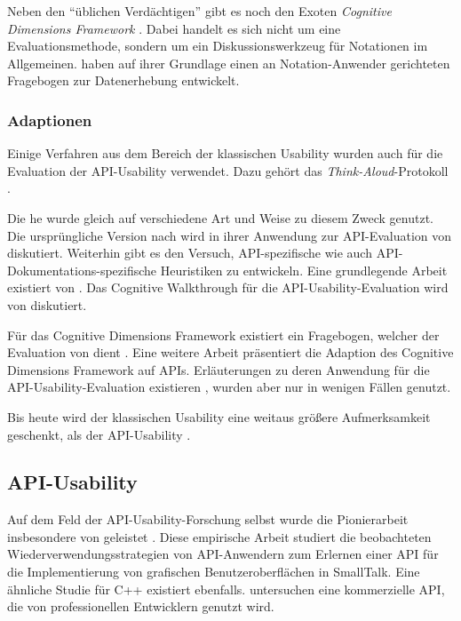 Neben den ``üblichen Verdächtigen'' gibt es noch den Exoten \textit{Cognitive Dimensions Framework} \citep{Green:1989wb,AnIntroductiontot:1996ux}. Dabei handelt es sich nicht um eine Evaluationsmethode, sondern um ein Diskussionswerkzeug für Notationen im Allgemeinen. \cite{161956} haben auf ihrer Grundlage einen an Notation-Anwender gerichteten Fragebogen zur Datenerhebung entwickelt.

\subsubsection{Adaptionen}

Einige Verfahren aus dem Bereich der klassischen Usability wurden auch für die Evaluation der API-Usability verwendet. Dazu gehört das \textit{Think-Aloud}-Protokoll \citep{Beaton:2008ix,Stylos:2007jb,Ellis:2007kv}.

Die \gls{he} wurde gleich auf verschiedene Art und Weise zu diesem Zweck genutzt. Die ursprüngliche Version nach \cite{Nielsen:1990bw} wird in ihrer Anwendung zur API-Evaluation von \cite{Beaton:2008ix} diskutiert. Weiterhin gibt es den Versuch, API-spezifische \citep{Grill:2012jm} wie auch API-Dokumentations-spezifische \citep{Watson:2012es} Heuristiken zu entwickeln. Eine grundlegende Arbeit existiert von \cite{Correia:2010bx}. Das Cognitive Walkthrough für die API-Usability-Evaluation wird von \cite{Beaton:2008ix} diskutiert.

Für das Cognitive Dimensions Framework existiert ein Fragebogen, welcher der Evaluation von  dient \citep{Kadoda:2000vj}. Eine weitere Arbeit \citep{Anonymous:9HSMlhmF} präsentiert die Adaption des Cognitive Dimensions Framework auf APIs. Erläuterungen zu deren Anwendung für die API-Usability-Evaluation existieren \citep{Clarke:2003wk,Clarke:2004te,clarke:2006}, wurden aber nur in wenigen Fällen \citep{roast2000formal,carroll2003hci,Piccioni:2013uq} genutzt.

Bis heute wird der klassischen Usability eine weitaus größere Aufmerksamkeit geschenkt, als der API-Usability \citep{Grill:2012jm}.

\subsection{API-Usability}

Auf dem Feld der API-Usability-Forschung selbst wurde die Pionierarbeit insbesondere von \cite{Rosson:1996da} geleistet \citep{Robillard:2010bh}. Diese empirische Arbeit studiert die beobachteten Wiederverwendungsstrategien von API-Anwendern zum Erlernen einer API für die Implementierung von grafischen Benutzeroberflächen in SmallTalk. Eine ähnliche Studie \citep{Shull:2000fy} für C++ existiert ebenfalls. \cite{McLellan:1998cu} untersuchen eine kommerzielle API, die von professionellen Entwicklern genutzt wird.

